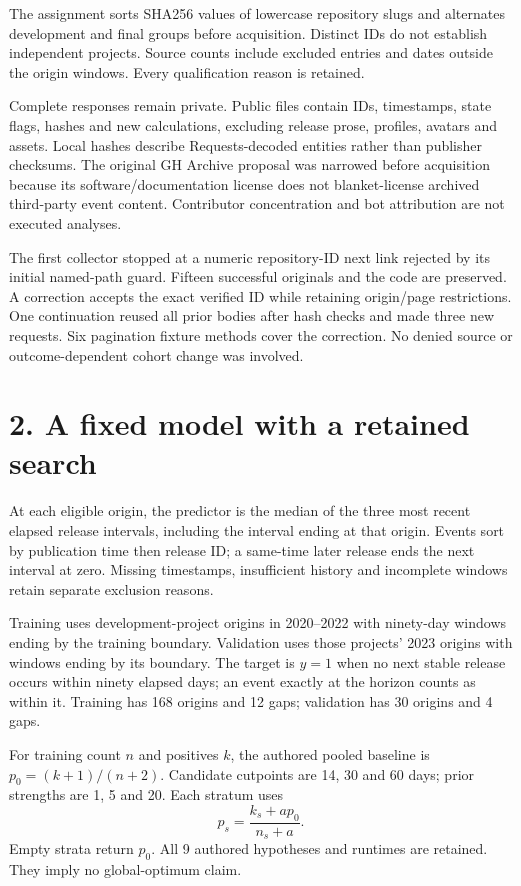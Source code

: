 \documentclass[11pt]{article}
\newcommand{\MTraining}{168}
\newcommand{\MValidation}{30}
\newcommand{\MTrainPos}{12}
\newcommand{\MValPos}{4}
\newcommand{\MCandidates}{9}
\begin{document}
The assignment sorts SHA256 values of lowercase repository slugs and alternates development and final groups before acquisition. Distinct IDs do not establish independent projects. Source counts include excluded entries and dates outside the origin windows. Every qualification reason is retained.

Complete responses remain private. Public files contain IDs, timestamps, state flags, hashes and new calculations, excluding release prose, profiles, avatars and assets. Local hashes describe Requests-decoded entities rather than publisher checksums. The original GH Archive proposal was narrowed before acquisition because its software/documentation license does not blanket-license archived third-party event content. Contributor concentration and bot attribution are not executed analyses.

The first collector stopped at a numeric repository-ID next link rejected by its initial named-path guard. Fifteen successful originals and the code are preserved. A correction accepts the exact verified ID while retaining origin/page restrictions. One continuation reused all prior bodies after hash checks and made three new requests. Six pagination fixture methods cover the correction. No denied source or outcome-dependent cohort change was involved.
\newpage
\section*{2. A fixed model with a retained search}
At each eligible origin, the predictor is the median of the three most recent elapsed release intervals, including the interval ending at that origin. Events sort by publication time then release ID; a same-time later release ends the next interval at zero. Missing timestamps, insufficient history and incomplete windows retain separate exclusion reasons.

Training uses development-project origins in 2020--2022 with ninety-day windows ending by the training boundary. Validation uses those projects' 2023 origins with windows ending by its boundary. The target is $y=1$ when no next stable release occurs within ninety elapsed days; an event exactly at the horizon counts as within it. Training has \MTraining{} origins and \MTrainPos{} gaps; validation has \MValidation{} origins and \MValPos{} gaps.

For training count $n$ and positives $k$, the authored pooled baseline is $p_0=(k+1)/(n+2)$. Candidate cutpoints are 14, 30 and 60 days; prior strengths are 1, 5 and 20. Each stratum uses
\[
 p_s=\frac{k_s+a p_0}{n_s+a}.
\]
Empty strata return $p_0$. All \MCandidates{} authored hypotheses and runtimes are retained. They imply no global-optimum claim.
\end{document}
